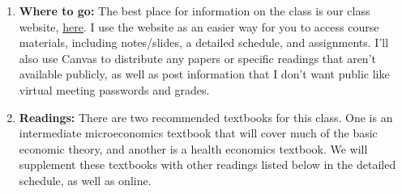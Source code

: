 \documentclass[11pt,]{article}
\begin{document}
\begin{enumerate}
\def\labelenumi{\arabic{enumi}.}
\item
  \textbf{Where to go:} The best place for information on the class is
  our class website,
  \href{https://econ372s21.classes.ianmccarthyecon.com/}{here}. I use
  the website as an easier way for you to access course materials,
  including notes/slides, a detailed schedule, and assignments. I'll
  also use Canvas to distribute any papers or specific readings that
  aren't available publicly, as well as post information that I don't
  want public like virtual meeting passwords and grades.
\item
  \textbf{Readings:} There are two recommended textbooks for this class.
  One is an intermediate microeconomics textbook that will cover much of
  the basic economic theory, and another is a health economics textbook.
  We will supplement these textbooks with other readings listed below in
  the detailed schedule, as well as online.


\end{enumerate}
\end{document}
